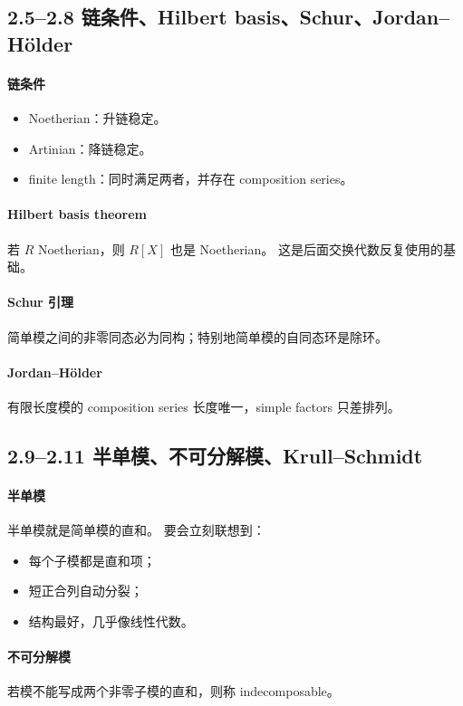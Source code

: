 \documentclass[a4paper]{ctexart}
\begin{document}
\subsection{2.5--2.8 链条件、Hilbert basis、Schur、Jordan--H\"older}

\paragraph{链条件}
\begin{itemize}
  \item Noetherian：升链稳定。
  \item Artinian：降链稳定。
  \item finite length：同时满足两者，并存在 composition series。
\end{itemize}

\paragraph{Hilbert basis theorem}
若 \(R\) Noetherian，则 \(R[X]\) 也是 Noetherian。
这是后面交换代数反复使用的基础。

\paragraph{Schur 引理}
简单模之间的非零同态必为同构；特别地简单模的自同态环是除环。

\paragraph{Jordan--H\"older}
有限长度模的 composition series 长度唯一，simple factors 只差排列。

\subsection{2.9--2.11 半单模、不可分解模、Krull--Schmidt}

\paragraph{半单模}
半单模就是简单模的直和。
要会立刻联想到：
\begin{itemize}
  \item 每个子模都是直和项；
  \item 短正合列自动分裂；
  \item 结构最好，几乎像线性代数。
\end{itemize}

\paragraph{不可分解模}
若模不能写成两个非零子模的直和，则称 indecomposable。
\end{document}

